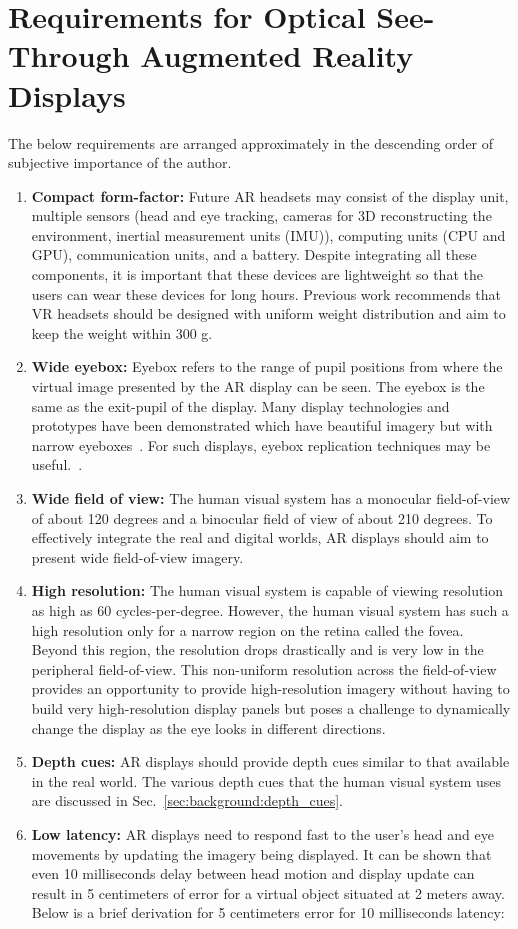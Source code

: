 \section{Requirements for Optical See-Through Augmented Reality Displays}
\label{sec:background:requirements_ar_displays}
The below requirements are arranged approximately in the descending order of subjective importance of the author.

\begin{enumerate}
    \item \textbf{Compact form-factor:} Future AR headsets may consist of the display unit, multiple sensors (head and eye tracking, cameras for 3D reconstructing the environment, inertial measurement units (IMU)), computing units (CPU and GPU), communication units, and a battery. Despite integrating all these components, it is important that these devices are lightweight so that the users can wear these devices for long hours. Previous work \cite{yan2018effects} recommends that VR headsets should be designed with uniform weight distribution and aim to keep the weight within 300 g.
    \item \textbf{Wide eyebox:} Eyebox refers to the range of pupil positions from where the virtual image presented by the AR display can be seen. The eyebox is the same as the exit-pupil of the display. Many display technologies and prototypes have been demonstrated which have beautiful imagery but with narrow eyeboxes~\cite{Maimone2017Holographic,westheimer1966maxwellian}. For such displays, eyebox replication techniques may be useful.~\cite{Jang2017Retinal}. 
    \item \textbf{Wide field of view:} The human visual system has a monocular field-of-view of about 120 degrees and a binocular field of view of about 210 degrees. To effectively integrate the real and digital worlds, AR displays should aim to present wide field-of-view imagery.
    \item \textbf{High resolution:} The human visual system is capable of viewing resolution as high as 60 cycles-per-degree. However, the human visual system has such a high resolution only for a narrow region on the retina called the fovea. Beyond this region, the resolution drops drastically and is very low in the peripheral field-of-view. This non-uniform resolution across the field-of-view provides an opportunity to provide high-resolution imagery without having to build very high-resolution display panels but poses a challenge to dynamically change the display as the eye looks in different directions.
    \item \textbf{Depth cues:} AR displays should provide depth cues similar to that available in the real world. The various depth cues that the human visual system uses are discussed in Sec.~\ref{sec:background:depth_cues}. 
    \item \textbf{Low latency:} AR displays need to respond fast to the user’s head and eye movements by updating the imagery being displayed. It can be shown that even 10 milliseconds delay between head motion and display update can result in 5 centimeters of error for a virtual object situated at 2 meters away. Below is a brief derivation for 5 centimeters error for 10 milliseconds latency:
 

\end{enumerate}
